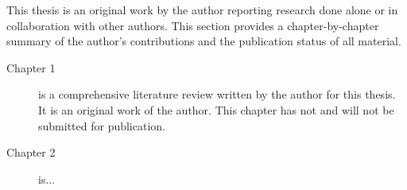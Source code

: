 This thesis is an original work by the author reporting research done alone or in collaboration with other authors. 
This section provides a chapter-by-chapter summary of the author's contributions and the publication status of all material.

\begin{description}
  \item[Chapter 1] is a comprehensive literature review written by the author for this thesis.
    It is an original work of the author.
    This chapter has not and will not be submitted for publication.
  \item[Chapter 2] is...
\end{description}

